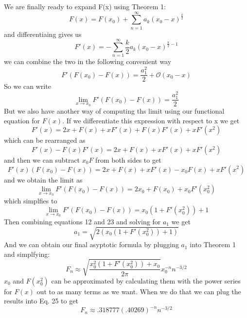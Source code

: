 \documentclass{article}
\begin{document}
We are finally ready to expand F(x) using Theorem 1:
\begin{equation}
F(x)=F(x_0)+\sum_{n=1}^\infty a_k(x_0-x)^{\frac{k}{2}}
\end{equation}
and differentiaing gives us
\begin{equation}
F'(x)=-\sum_{n=1}^\infty \frac{k}{2} a_k(x_0-x)^{\frac{k}{2}-1}
\end{equation}
we can combine the two in the following convenient way
\begin{equation}
F'(F(x_0)-F(x))=\frac{a_1^2}{2} + \mathscr{O}(x_0-x)
\end{equation}
So we can write
\begin{equation}
\lim_{x\to x_0}F'(F(x_0)-F(x))=\frac{a_1^2}{2}
\end{equation}
 But we also have another way of computing ths limit using our functional equation for \(F(x)\). If we differentiate this expression with respect to x we get
\begin{equation}
F'(x)=2x+F(x)+xF'(x)+F(x)F'(x)+xF'(x^2)
\end{equation}
which can be rearranged as
\[F'(x)-F(x)F'(x)=2x+F(x)+xF'(x)+xF'(x^2)\]
and then we can subtract \(x_0F\) from both sides to get
\[F'(x)(F(x_0)-F(x))=2x+F(x)+xF'(x)-x_0F(x)+xF'(x^2)\]
and we obtain the limit as
\[\lim_{x\to x_0}F'(F(x_0)-F(x))=2x_0+F(x_0)+x_0F'(x_0^2)\]
which simplfies to
\begin{equation}
\lim_{x\to x_0}F'(F(x_0)-F(x))=x_0(1+F'(x_0^2))+1
\end{equation}
Then combining equations 12 and 23 and solving for \(a_1\) we get
\begin{equation}
a_1=\sqrt{2(x_0(1+F'(x_0^2))+1)}
\end{equation}
And we can obtain our final asyptotic formula by plugging \(a_1\) into Theorem 1 and simplfying:
\begin{equation}
F_n \approx \sqrt{\frac{x_0^2(1+F'(x_0^2))+x_0}{2\pi}}x_0^{-n}n^{-3/2}
\end{equation}
\(x_0\) and \(F(x_0^2)\) can be approximated by calculating them with the power series for \(F(x)\) out to as many terms as we want. When we do that we can plug the results into Eq. 25 to get 
\begin{equation}
F_n \approx .318777(.40269)^{-n}n^{-3/2}
\end{equation}
\end{document}

